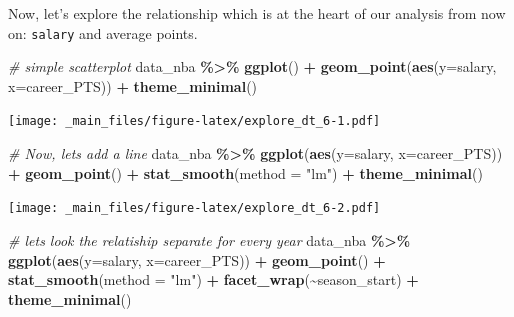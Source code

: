 \documentclass[
]{book}
\newenvironment{Shaded}{\begin{snugshade}}{\end{snugshade}}
\newcommand{\AttributeTok}[1]{\textcolor[rgb]{0.13,0.29,0.53}{#1}}
\newcommand{\CommentTok}[1]{\textcolor[rgb]{0.56,0.35,0.01}{\textit{#1}}}
\newcommand{\FunctionTok}[1]{\textcolor[rgb]{0.13,0.29,0.53}{\textbf{#1}}}
\newcommand{\NormalTok}[1]{#1}
\newcommand{\SpecialCharTok}[1]{\textcolor[rgb]{0.81,0.36,0.00}{\textbf{#1}}}
\newcommand{\StringTok}[1]{\textcolor[rgb]{0.31,0.60,0.02}{#1}}
\begin{document}
Now, let's explore the relationship which is at the heart of our analysis from now on: \texttt{salary} and average points.

\begin{Shaded}
\begin{Highlighting}[]
\CommentTok{\# simple scatterplot}
\NormalTok{data\_nba }\SpecialCharTok{\%\textgreater{}\%} \FunctionTok{ggplot}\NormalTok{() }\SpecialCharTok{+}
\FunctionTok{geom\_point}\NormalTok{(}\FunctionTok{aes}\NormalTok{(}\AttributeTok{y=}\NormalTok{salary, }\AttributeTok{x=}\NormalTok{career\_PTS)) }\SpecialCharTok{+} 
  \FunctionTok{theme\_minimal}\NormalTok{()}
\end{Highlighting}
\end{Shaded}

\texttt{[image: \_main\_files/figure-latex/explore\_dt\_6-1.pdf]}

\begin{Shaded}
\begin{Highlighting}[]
\CommentTok{\# Now, let\textquotesingle{}s add a line}
\NormalTok{data\_nba }\SpecialCharTok{\%\textgreater{}\%} 
  \FunctionTok{ggplot}\NormalTok{(}\FunctionTok{aes}\NormalTok{(}\AttributeTok{y=}\NormalTok{salary, }\AttributeTok{x=}\NormalTok{career\_PTS)) }\SpecialCharTok{+}
    \FunctionTok{geom\_point}\NormalTok{() }\SpecialCharTok{+} 
     \FunctionTok{stat\_smooth}\NormalTok{(}\AttributeTok{method =} \StringTok{"lm"}\NormalTok{) }\SpecialCharTok{+} 
       \FunctionTok{theme\_minimal}\NormalTok{()}
\end{Highlighting}
\end{Shaded}

\texttt{[image: \_main\_files/figure-latex/explore\_dt\_6-2.pdf]}

\begin{Shaded}
\begin{Highlighting}[]
\CommentTok{\# let\textquotesingle{}s look the relatiship separate for every year}
\NormalTok{data\_nba }\SpecialCharTok{\%\textgreater{}\%} 
  \FunctionTok{ggplot}\NormalTok{(}\FunctionTok{aes}\NormalTok{(}\AttributeTok{y=}\NormalTok{salary, }\AttributeTok{x=}\NormalTok{career\_PTS)) }\SpecialCharTok{+}
    \FunctionTok{geom\_point}\NormalTok{() }\SpecialCharTok{+} 
     \FunctionTok{stat\_smooth}\NormalTok{(}\AttributeTok{method =} \StringTok{"lm"}\NormalTok{) }\SpecialCharTok{+} 
        \FunctionTok{facet\_wrap}\NormalTok{(}\SpecialCharTok{\textasciitilde{}}\NormalTok{season\_start) }\SpecialCharTok{+} 
       \FunctionTok{theme\_minimal}\NormalTok{()}
\end{Highlighting}
\end{Shaded}
\end{document}
